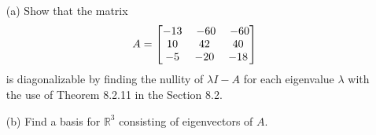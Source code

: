 \begin{exer}

\begin{enumerate}
\item[(a)] Show that the matrix
$$A = \begin{bmatrix}-13&\hspace{1mm} -60&\hspace{1mm} -60\\ 10 & 42 & 40\\ -5 & -20 & -18 \end{bmatrix}$$
is diagonalizable by finding the nullity of $\lambda I - A$ for each eigenvalue $\lambda$ with the use of Theorem 8.2.11 in the Section 8.2.
\item[(b)] Find a basis for $\mathbb{R}^{3}$ consisting of eigenvectors of $A$.
\end{enumerate}
\end{exer}

